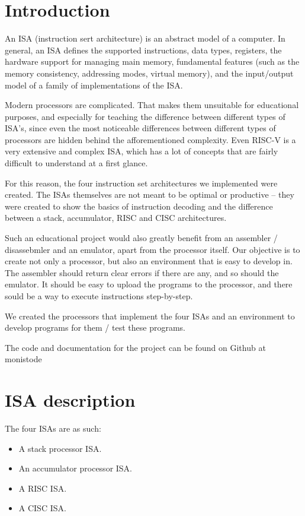 \documentclass[conference]{IEEEtran}
\begin{document}
\section{Introduction}
An ISA (instruction sert architecture) is an abstract model of a computer.
In general, an ISA defines the supported instructions, data types, registers,
the hardware support for managing main memory, fundamental features
(such as the memory consistency, addressing modes, virtual memory),
and the input/output model of a family of implementations of the ISA. \cite{b7}

Modern processors are complicated. That makes them unsuitable for educational purposes, and
especially for teaching the difference between different types of ISA's, since even the
most noticeable differences between different types of processors are hidden behind the afforementioned complexity.
Even RISC-V is a very extensive and complex ISA, which has a lot of concepts that are fairly
difficult to understand at a first glance.

For this reason, the four instruction set architectures we implemented were created. \cite{b1}
The ISAs themselves are not meant to be optimal or productive -- they were created to show
the basics of instruction decoding and the difference between a stack, accumulator, RISC and CISC architectures.

Such an educational project would also greatly benefit from an assembler / disassebmler and an emulator,
apart from the processor itself. Our objective is to create not only a processor, but also an environment
that is easy to develop in. The assembler should return clear errors if there are any,
and so should the emulator. It should be easy to upload the programs to the processor,
and there sould be a way to execute instructions step-by-step.

We created the processors that implement the four ISAs and an environment to develop
programs for them / test these programs.

The code and documentation for the project can be found on Github at monistode \cite{b9}

\section {ISA description}
The four ISAs are as such:
\begin{itemize}
	\item A stack processor ISA.
	\item An accumulator processor ISA.
	\item A RISC ISA.
	\item A CISC ISA.
\end{itemize}
\end{document}
